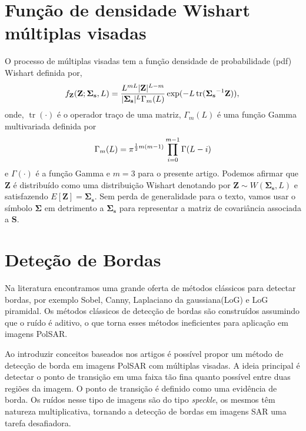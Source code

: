 \documentclass[conference]{IEEEtran}
\DeclareMathOperator{\traco}{tr}
\begin{document}
\section{Função de densidade Wishart múltiplas visadas}\label{sec_03}
O processo de múltiplas visadas tem a função densidade de probabilidade (pdf) Wishart  definida por,
\begin{equation}\label{eq_05}
    f_{\mathbf{Z}}(\mathbf{Z};\mathbf{\Sigma_{s}},L)=\frac{L^{mL}|\mathbf{Z}|^{L-m}}{|\mathbf{\Sigma_{s}}|^{L}\Gamma_m(L)} \exp(-L\traco(\mathbf{\Sigma_{s}}^{-1}\mathbf{Z})), \\
\end{equation} 
onde, $\traco(\cdot)$ é o operador traço de uma matriz, $\Gamma_m(L)$ é uma função Gamma multivariada definida por
\begin{equation*}
	\Gamma_m(L)=\pi^{\frac{1}{2}m(m-1)} \prod_{i=0}^{m-1}\Gamma(L-i) \\
\end{equation*}
e $\Gamma(\cdot)$ é a função Gamma e $m=3$ para o presente artigo. Podemos afirmar que $\mathbf{Z}$ é distribuído como uma distribuição Wishart denotando por $\mathbf{Z}\sim W(\mathbf{\Sigma_{s}}, L)$ e satisfazendo $E[\mathbf{Z}]=\mathbf{\Sigma_{s}}$. Sem perda de generalidade para o texto, vamos usar o símbolo $\mathbf{\Sigma}$ em detrimento a $\mathbf{\Sigma_{s}}$ para representar a matriz de covariância associada a $\mathbf{S}$.

\section{Deteção de Bordas}\label{sec_04}

Na literatura encontramos uma grande oferta de métodos clássicos para detectar bordas, por exemplo Sobel, Canny, Laplaciano da gaussiana(LoG) e LoG piramidal. Os métodos clássicos de detecção de bordas são construídos assumindo que o ruído é aditivo, o que torna esses métodos ineficientes para aplicação em imagens PolSAR.

Ao introduzir conceitos baseados nos artigos \cite{nhfc, gmbf} é possível propor um método de detecção de borda em imagens PolSAR com múltiplas visadas. A ideia principal é detectar o ponto de transição em uma faixa tão fina quanto possível entre duas regiões da imagem. O ponto de transição é definido como uma evidência de borda. Os ruídos nesse tipo de imagens são do tipo \textit{speckle}, os mesmos têm natureza multiplicativa, tornando a detecção de bordas em imagens SAR uma tarefa desafiadora.
\end{document}
